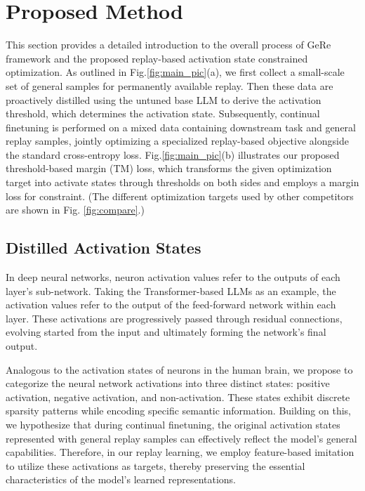 \section{Proposed Method}\label{sec:Proposed Method}
This section provides a detailed introduction to the overall process of GeRe framework and the proposed replay-based activation state constrained optimization.
As outlined in Fig.\ref{fig:main_pic}(a),
we first collect a small-scale set of general samples for permanently available replay.
Then these data are proactively distilled using the untuned base LLM to derive the activation threshold, which determines the activation state. Subsequently, continual finetuning is performed on a mixed data containing downstream task and general replay samples, jointly optimizing a specialized replay-based objective alongside the standard cross-entropy loss.
Fig.\ref{fig:main_pic}(b) illustrates our proposed threshold-based margin (TM) loss, which transforms the given optimization target into activate states through thresholds on both sides and employs a margin loss for constraint.
(The different optimization targets used by other competitors are shown in Fig. \ref{fig:compare}.)

\subsection{Distilled Activation States}\label{sec:Neural Activation Distribution}
In deep neural networks, neuron activation values refer to the outputs of each layer's sub-network.
Taking the Transformer-based LLMs as an example, the activation values refer to the output of the feed-forward network within each layer.
These activations are progressively passed through residual connections, evolving started from the input and ultimately forming the network's final output.

Analogous to the activation states of neurons in the human brain, we propose to categorize the neural network activations into three distinct states: positive activation, negative activation, and non-activation. These states exhibit discrete sparsity patterns while encoding specific semantic information.
Building on this, we hypothesize that during continual finetuning, the original activation states represented with general replay samples can effectively reflect the model's general capabilities. Therefore, in our replay learning, we employ feature-based imitation to utilize these activations as targets, thereby preserving the essential characteristics of the model's learned representations.

